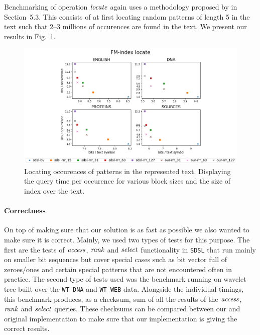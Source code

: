 Benchmarking of operation $\mathit{locate}$ again uses a methodology proposed by \cite{ferragina2009compressed} 
in Section~5.3. This consists of at first locating random patterns of length 5 in the text such
that 2--3 millions of occurences are found in the text. We present our results in Fig.~\ref{obr:benchmark_sdsl_locate}.

\begin{figure}
	\centerline{
		\includegraphics[width=\textwidth, height=0.4\textheight]{images/vysledky_sdsl_locate}
	}
	\caption[TODO]{Locating occurences of patterns in the represented text. Displaying
	the query time per occurence for various block sizes and the size of index over the
	text.
	}
	\label{obr:benchmark_sdsl_locate}
\end{figure}

\paragraph{Correctness}

On top of making sure that our solution is as fast as possible we also wanted to make sure it is
correct. Mainly, we used two types of tests for this purpose. The first are the tests of $\mathit{access}$,
$\mathit{rank}$ and $\mathit{select}$ functionality in \texttt{SDSL} that run mainly on smaller bit sequences
but cover special cases such as bit vector full of zeroes/ones and certain special patterns
that are not encountered often in practice. The second type of tests used was the benchmark
running on wavelet tree built over the \texttt{WT-DNA} and \texttt{WT-WEB} data. Alongside
the individual timings, this benchmark produces, as a checksum, sum of all the results of the
$\mathit{access}$, $\mathit{rank}$ and $\mathit{select}$ queries. These checksums can be compared between our and original
implementation to make sure that our implementation is giving the correct results.

